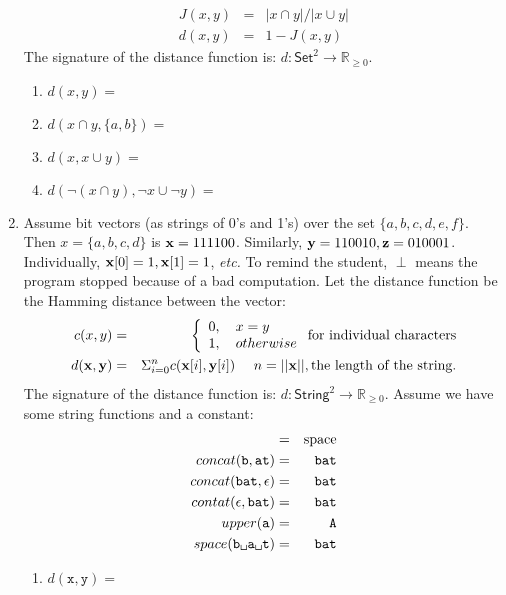\documentclass{article}
\begin{document}
\begin{enumerate}
 \begin{eqnarray*}  J(x,y) &=&|x \cap y|/|x \cup y| \\   d(x,y) &=& 1-J(x,y) \end{eqnarray*}
The signature of the distance function is: $d:\mathsf{Set}^2 \rightarrow \mathbb{R}_{\geq 0}$.
\begin{enumerate}
\item $d(x,y) = $
\item $d(x\cap y, \{a, b\}) = $
\item $d(x, x \cup y) =$
\item $d(\neg(x \cap y), \neg x \cup \neg y) =$
\end{enumerate}
\item Assume bit vectors (as strings of 0's and 1's)  over the set $\{a,b,c,d,e,f\}$.  Then $x = \{a,b,c,d\}$ is $\mathrm{\bf x} = 111100$.  Similarly, $\mathrm{\bf y} = 110010, \mathrm{\bf z} = 010001$.  Individually, $ \mathrm{\bf x}[0] = 1, \mathrm{\bf x}[1] = 1$, {\it etc.}  To remind the student, $\perp$ means the program stopped because of a bad computation. Let the distance function be the Hamming distance between the vector:
\begin{eqnarray}
c(x,y) &=& \left\{\begin{array}{l}0, \ \ \ x = y\\ 1, \ \ \ ot herwise\end{array}\right. \mbox{\rm for individual characters}\\
d(\mathrm{\bf x},\mathrm{\bf y}) &=& \Sigma_{i=0}^{n}c(\mathrm{\bf x}[i], \mathrm{\bf y}[i]) \ \ \ \ n = ||\mathrm{\bf x}||, \mbox{\rm the length of the string.}
\end{eqnarray}
The signature of the distance function is: $d:\mathsf{String}^2 \rightarrow \mathbb{R}_{\geq 0}$.  Assume we have some string functions and a constant:
\begin{eqnarray}
\textvisiblespace &=& \mbox{\rm space}\\
concat(\texttt{b}, \texttt{at}) &=& \texttt{bat}\\
concat(\texttt{bat}, \epsilon) &=& \texttt{bat}\\
contat(\epsilon, \texttt{bat}) &=& \texttt{bat}\\
upper(\texttt{a}) &=& \texttt{A}\\
space(\texttt{b\textvisiblespace a\textvisiblespace t}) &=& \texttt{bat}
\end{eqnarray}
\begin{enumerate}
\item $d(\texttt{x}, \texttt{y}) = $

\end{enumerate}
\end{enumerate}
\end{document}
